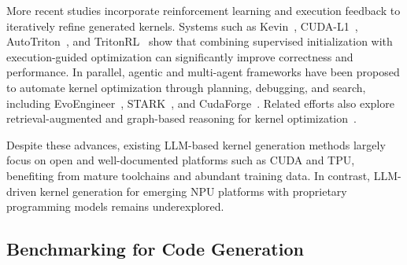 More recent studies incorporate reinforcement learning and execution feedback to iteratively refine generated kernels. Systems such as Kevin~\cite{baronio2025kevin}, CUDA-L1~\cite{li2025cuda}, AutoTriton~\cite{li2025autotriton}, and TritonRL~\cite{woo2025tritonrl} show that combining supervised initialization with execution-guided optimization can significantly improve correctness and performance. In parallel, agentic and multi-agent frameworks have been proposed to automate kernel optimization through planning, debugging, and search, including EvoEngineer~\cite{guo2025evoengineer}, STARK~\cite{dong2025stark}, and CudaForge~\cite{zhang2025cudaforge}. Related efforts also explore retrieval-augmented and graph-based reasoning for kernel optimization~\cite{gong2025large}.

Despite these advances, existing LLM-based kernel generation methods largely focus on open and well-documented platforms such as CUDA and TPU, benefiting from mature toolchains and abundant training data. In contrast, LLM-driven kernel generation for emerging NPU platforms with proprietary programming models remains underexplored.


\subsection{Benchmarking for Code Generation}

